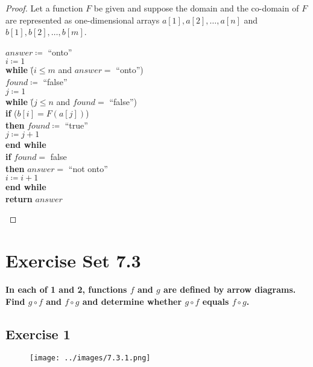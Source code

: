 \documentclass[14pt]{extarticle}
\newcommand{\cy}{\color{cyan}}
\begin{document}
\begin{proof}
    Let a function $F$ be given and suppose the domain and the co-domain of $F$ are represented as one-dimensional arrays
    \(a[1], a[2], \ldots, a[n]\) and \(b[1], b[2], \ldots, b[m]\).

    \begin{tabbing}
        \(answer \coloneqq\) ``onto'' \\
        \(i \coloneqq 1\) \\
        {\bf while} \= (\(i\leq m\) and \(answer = \) ``onto'') \\
        \> \(found \coloneqq\) ``false'' \\
        \> \(j \coloneqq 1\) \\
        \> {\bf while} \= (\(j \leq n\) and \(found =\) ``false'') \\
        \>             \> {\bf if} (\(b[i]=F(a[j])\))\\
        \>             \> {\bf then} \(found \coloneqq \) ``true'' \\
        \>             \> \(j \coloneqq j + 1\) \\
        \> {\bf end while} \\
        \> {\bf if} \(found = \) false \\
        \> {\bf then} \(answer = \) ``not onto'' \\
        \(i \coloneqq i + 1\) \\
        {\bf end while} \\
        {\bf return} $answer$
    \end{tabbing}
\end{proof}

\section{Exercise Set 7.3}

 {\bf \cy In each of 1 and 2, functions $f$ and $g$ are defined by arrow diagrams. Find \(g \circ f\) and
  \(f \circ g\) and determine whether \(g \circ f\) equals \(f \circ g\).}

\subsection{Exercise 1}
\begin{figure}[ht!]
    \centering
    \texttt{[image: ../images/7.3.1.png]}
\end{figure}
\end{document}
